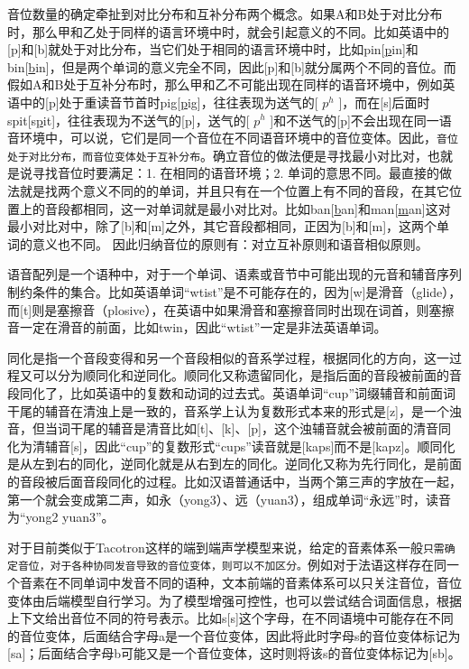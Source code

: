 \documentclass[cn,10pt,math=newtx,citestyle=gb7714-2015,bibstyle=gb7714-2015]{elegantbook}
\begin{document}
音位数量的确定牵扯到对比分布和互补分布两个概念。如果A和B处于对比分布时，那么甲和乙处于同样的语言环境中时，就会引起意义的不同。比如英语中的[p]和[b]就处于对比分布，当它们处于相同的语言环境中时，比如pin[\underline{p}in]和bin[\underline{b}in]，但是两个单词的意义完全不同，因此[p]和[b]就分属两个不同的音位。而假如A和B处于互补分布时，那么甲和乙不可能出现在同样的语音环境中，例如英语中的[p]处于重读音节首时pig[\underline{p}ig]，往往表现为送气的[ $p^h$ ]，而在[s]后面时spit[s\underline{p}it]，往往表现为不送气的[p]，送气的[ $p^h$ ]和不送气的[p]不会出现在同一语音环境中，可以说，它们是同一个音位在不同语音环境中的音位变体。因此，\lstinline{音位处于对比分布，而音位变体处于互补分布}。确立音位的做法便是寻找最小对比对，也就是说寻找音位时要满足：1. 在相同的语音环境；2. 单词的意思不同。最直接的做法就是找两个意义不同的的单词，并且只有在一个位置上有不同的音段，在其它位置上的音段都相同，这一对单词就是最小对比对。比如ban[\underline{b}an]和man[\underline{m}an]这对最小对比对中，除了[b]和[m]之外，其它音段都相同，正因为[b]和[m]，这两个单词的意义也不同。 因此归纳音位的原则有：对立互补原则和语音相似原则。

语音配列是一个语种中，对于一个单词、语素或音节中可能出现的元音和辅音序列制约条件的集合。比如英语单词“wtist”是不可能存在的，因为[w]是滑音（glide），而[t]则是塞擦音（plosive），在英语中如果滑音和塞擦音同时出现在词首，则塞擦音一定在滑音的前面，比如twin，因此“wtist”一定是非法英语单词。

同化是指一个音段变得和另一个音段相似的音系学过程，根据同化的方向，这一过程又可以分为顺同化和逆同化。顺同化又称遗留同化，是指后面的音段被前面的音段同化了，比如英语中的复数和动词的过去式。英语单词“cup”词缀辅音和前面词干尾的辅音在清浊上是一致的，音系学上认为复数形式本来的形式是[z]，是一个浊音，但当词干尾的辅音是清音比如[t]、[k]、[p]，这个浊辅音就会被前面的清音同化为清辅音[s]，因此“cup”的复数形式“cups”读音就是[kaps]而不是[kapz]。顺同化是从左到右的同化，逆同化就是从右到左的同化。逆同化又称为先行同化，是前面的音段被后面音段同化的过程。比如汉语普通话中，当两个第三声的字放在一起，第一个就会变成第二声，如永（yong3）、远（yuan3），组成单词“永远”时，读音为“yong2 yuan3”。

对于目前类似于Tacotron这样的端到端声学模型来说，给定的音素体系一般\lstinline{只需确定音位，对于各种协同发音导致的音位变体，则可以不加区分。}例如对于法语这样存在同一个音素在不同单词中发音不同的语种，文本前端的音素体系可以只关注音位，音位变体由后端模型自行学习。为了模型增强可控性，也可以尝试结合词面信息，根据上下文给出音位不同的符号表示。比如s[s]这个字母，在不同语境中可能存在不同的音位变体，后面结合字母a是一个音位变体，因此将此时字母s的音位变体标记为[sa]；后面结合字母b可能又是一个音位变体，这时则将该s的音位变体标记为[sb]。
\end{document}
